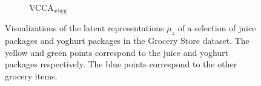 \begin{figure}[t]
\begin{subfigure}[b]{0.3\textwidth}
         \caption{VCCA$_{x i w y}$}
         \label{fig:pca_vcca_xiwy_juice_yoghurt}
     \end{subfigure} 
    \vspace{-2mm}
    \caption{Visualizations of the latent representations $\mu_{z}$ of a selection of juice packages and yoghurt packages in the Grocery Store dataset. The yellow and green points correspond to the juice and yoghurt packages respectively. The blue points correspond to the other grocery items. 
	}
    \label{fig:2d_visualizations_pca_juice_yoghurt}
    \vspace{-3mm}
\end{figure}

